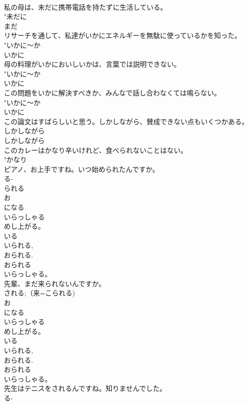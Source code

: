 \documentclass[8pt]{extreport}
\begin{document}
\begin{CJK}{UTF8}{min}
{\\	私の母は、未だに携帯電話を持たずに生活している。	
\\	"未だに 
\\	まだ 
\\	リサーチを通して、私達がいかにエネルギーを無駄に使っているかを知った。	
\\	"いかに〜か 
\\	いかに 
\\	母の料理がいかにおいしいかは、言葉では説明できない。	
\\	"いかに〜か 
\\	いかに 
\\	この問題をいかに解決すべきか、みんなで話し合わなくては鳴らない。	
\\	"いかに〜か 
\\	いかに 
\\	この論文はすばらしいと思う。しかしながら、賛成できない点もいくつかある。	
\\	しかしながら 
\\	しかしながら 
\\	このカレーはかなり辛いけれど、食べられないことはない。	
\\	"かなり 
\\	ピアノ、お上手ですね。いつ始められたんですか。	
\\	る-
\\	られる 
\\	お
\\	になる 
\\	いらっしゃる 
\\	めし上がる。 
\\	いる 
\\	いられる, 
\\	おられる. 
\\	おられる 
\\	いらっしゃる。
\\	先輩、まだ来られないんですか。	
\\	される;（来=こられる) 
\\	お
\\	になる 
\\	いらっしゃる 
\\	めし上がる。 
\\	いる 
\\	いられる, 
\\	おられる. 
\\	おられる 
\\	いらっしゃる。
\\	先生はテニスをされるんですね。知りませんでした。	
\\	る-
}
\end{CJK}
\end{document}
